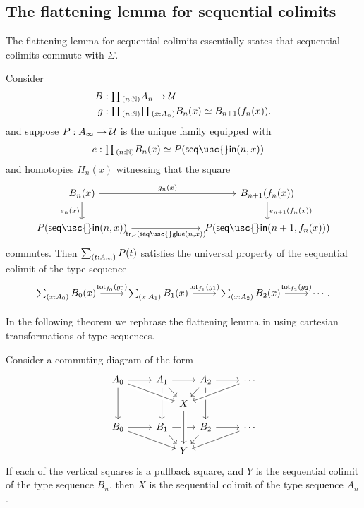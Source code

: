 \subsection{The flattening lemma for sequential colimits}

The flattening lemma for sequential colimits essentially states that sequential colimits commute with $\Sigma$. 

\begin{lem}
Consider
\begin{align*}
B & : \prd{n:\N}A_n\to\UU \\
g & : \prd{n:\N}{x:A_n}\eqv{B_n(x)}{B_{n+1}(f_n(x))}.
\end{align*}
and suppose $P:A_\infty\to\mathcal{U}$ is the unique family equipped with
\begin{align*}
e & : \prd{n:\N}\eqv{B_n(x)}{P(\mathsf{seq\usc{}in}(n,x))}
\end{align*}
and homotopies $H_n(x)$ witnessing that the square
\begin{equation*}
\begin{tikzcd}[column sep=7em]
B_n(x) \arrow[r,"g_n(x)"] \arrow[d,swap,"e_n(x)"] & B_{n+1}(f_n(x)) \arrow[d,"e_{n+1}(f_n(x))"] \\
P(\mathsf{seq\usc{}in}(n,x)) \arrow[r,swap,"{\mathsf{tr}_P(\mathsf{seq\usc{}glue}(n,x))}"] & P(\mathsf{seq\usc{}in}(n+1,f_n(x)))
\end{tikzcd}
\end{equation*}
commutes. Then $\sm{t:A_\infty}P(t)$ satisfies the universal property of the sequential colimit of the type sequence
\begin{equation*}
\begin{tikzcd}
\sm{x:A_0}B_0(x) \arrow[r,"{\tot[f_0]{g_0}}"] & \sm{x:A_1}B_1(x) \arrow[r,"{\tot[f_1]{g_1}}"] & \sm{x:A_2}B_2(x) \arrow[r,"{\tot[f_2]{g_2}}"] & \cdots.
\end{tikzcd}
\end{equation*}
\end{lem}

In the following theorem we rephrase the flattening lemma in using cartesian transformations of type sequences.

\begin{thm}
Consider a commuting diagram of the form
\begin{equation*}
\begin{tikzcd}[column sep=small,row sep=small]
A_0 \arrow[rr] \arrow[dd] & & A_1 \arrow[rr] \arrow[dr] \arrow[dd] &[-.9em] &[-.9em] A_2 \arrow[dl] \arrow[dd] & & \cdots \\
& & & X \arrow[from=ulll,crossing over] \arrow[from=urrr,crossing over] \arrow[from=ur,to=urrr] \\
B_0 \arrow[rr] \arrow[drrr] & & B_1 \arrow[rr] \arrow[dr] & & B_2 \arrow[rr] \arrow[dl] & & \cdots \arrow[dlll] \\
& & & Y \arrow[from=uu,crossing over] 
\end{tikzcd}
\end{equation*}
If each of the vertical squares is a pullback square, and $Y$ is the sequential colimit of the type sequence $B_n$, then $X$ is the sequential colimit of the type sequence $A_n$. 
\end{thm}

